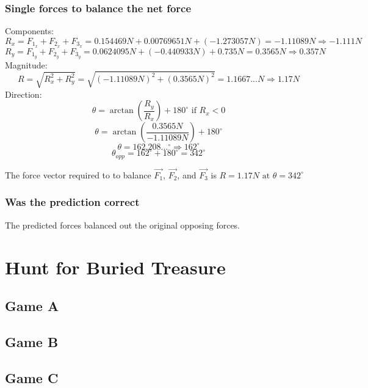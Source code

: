 \documentclass[11pt, letterpaper, includehead]{article}
\begin{document}
\subsubsection{Single forces to balance the net force} %
Components:
$$R_x = F_{1_x} + F_{2_x} + F_{3_x} = 0.154469N + 0.00769651N + (-1.273057N) = -1.11089N \Rightarrow \boxed{-1.111N} $$
$$R_y = F_{1_y} + F_{2_y} + F_{3_y} = 0.0624095N + (-0.440933N) + 0.735N = 0.3565N \Rightarrow \boxed{0.357N} $$
Magnitude:
$$R = \sqrt{R_x^2 + R_y^2} = \sqrt{(-1.11089N)^2 + (0.3565N)^2} = 1.1667...N \Rightarrow \boxed{1.17N}$$
Direction:
$$\theta = \arctan \left( \frac{R_y}{R_x} \right) + 180^{\circ} \text{ if } R_x < 0$$
$$\theta = \arctan \left( \frac{0.3565N}{-1.11089N} \right) + 180^{\circ}$$
$$\theta = 162.208\dots^{\circ} \Rightarrow {162^{\circ}}$$
$$\theta_{opp} = 162^{\circ} + 180^{\circ} = \boxed{342^{\circ}}$$

The force vector required to to balance $\vec{F_1}$, $\vec{F_2}$, and $\vec{F_3}$ is
$R = 1.17N \text{ at } \theta = 342^{\circ}$

\subsubsection{Was the prediction correct} %
The predicted forces balanced out the original opposing forces. 

\section{Hunt for Buried Treasure} %
\subsection{Game A} %
\subsection{Game B} %
\subsection{Game C} %
\end{document}

